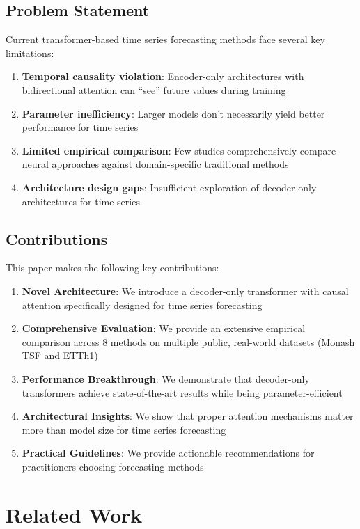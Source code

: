 \documentclass[11pt]{article}
\begin{document}
\subsection{Problem Statement}

Current transformer-based time series forecasting methods face several key limitations:

\begin{enumerate}
\item \textbf{Temporal causality violation}: Encoder-only architectures with bidirectional attention can ``see'' future values during training
\item \textbf{Parameter inefficiency}: Larger models don't necessarily yield better performance for time series
\item \textbf{Limited empirical comparison}: Few studies comprehensively compare neural approaches against domain-specific traditional methods
\item \textbf{Architecture design gaps}: Insufficient exploration of decoder-only architectures for time series
\end{enumerate}

\subsection{Contributions}

This paper makes the following key contributions:

\begin{enumerate}
\item \textbf{Novel Architecture}: We introduce a decoder-only transformer with causal attention specifically designed for time series forecasting
\item \textbf{Comprehensive Evaluation}: We provide an extensive empirical comparison across 8 methods on multiple public, real-world datasets (Monash TSF and ETTh1)
\item \textbf{Performance Breakthrough}: We demonstrate that decoder-only transformers achieve state-of-the-art results while being parameter-efficient
\item \textbf{Architectural Insights}: We show that proper attention mechanisms matter more than model size for time series forecasting
\item \textbf{Practical Guidelines}: We provide actionable recommendations for practitioners choosing forecasting methods
\end{enumerate}

\section{Related Work}
\end{document}
